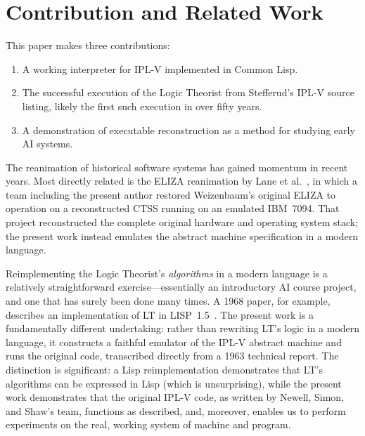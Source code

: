 \documentclass[journal]{IEEEtran}
\begin{document}
\section{Contribution and Related Work}
\label{sec:related}

This paper makes three contributions:

\begin{enumerate}
\item A working interpreter for IPL-V implemented in Common Lisp.
\item The successful execution of the Logic Theorist from Stefferud’s IPL-V source listing, likely the first such execution in over fifty years.
\item A demonstration of executable reconstruction as a method for studying early AI systems.
\end{enumerate}

The reanimation of historical software systems has gained momentum in
recent years. Most directly related is the ELIZA reanimation by Lane
et al.~\cite{lane2025eliza}, in which a team including the present
author restored Weizenbaum's original ELIZA to operation on a
reconstructed CTSS running on an emulated IBM~7094. That project
reconstructed the complete original hardware and operating system
stack; the present work instead emulates the abstract machine
specification in a modern language.

Reimplementing the Logic Theorist's \textit{algorithms} in a modern
language is a relatively straightforward exercise---essentially an
introductory AI course project, and one that has surely been done many
times. A 1968 paper, for example, describes an implementation of LT in
LISP~1.5~\cite{millstein1968logic}. The present work is a
fundamentally different undertaking: rather than rewriting LT's logic
in a modern language, it constructs a faithful emulator of the IPL-V
abstract machine and runs the original code, transcribed directly from
a 1963 technical report. The distinction is significant: a Lisp
reimplementation demonstrates that LT's algorithms can be expressed in
Lisp (which is unsurprising), while the present work demonstrates that
the original IPL-V code, as written by Newell, Simon, and Shaw's team,
functions as described, and, moreover, enables us to perform
experiments on the real, working system of machine and program.

\end{document}
